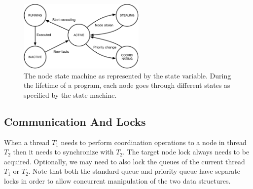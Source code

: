 \begin{figure}[ht]
   \centering
   \includegraphics[width=0.55\textwidth]{figures/implementation/node_states.pdf}
   \caption{The node state machine as represented by the state variable. During
      the lifetime of a program, each node goes through different states as
      specified by the state machine.}
   \label{fig:implementation:node_states}
\end{figure}

\subsection{Communication And Locks}

When a thread $T_1$ needs to perform coordination operations to a node in thread
$T_2$ then it needs to synchronize with $T_2$. The target node lock always needs
to be acquired.  Optionally, we may need to also lock the queues of the current
thread $T_1$ or $T_2$.  Note that both the standard queue and priority
queue have separate locks in order to allow concurrent manipulation of the two
data structures.
